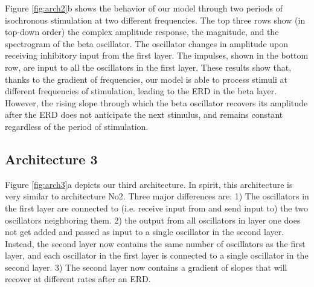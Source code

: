 \documentclass{article}
\begin{document}
Figure \ref{fig:arch2}b shows the behavior of our model through two periods of isochronous stimulation at two different frequencies. The top three rows show (in top-down order) the complex amplitude response, the magnitude, and the spectrogram of the beta oscillator. The oscillator changes in amplitude upon receiving inhibitory input from the first layer. The impulses, shown in the bottom row, are input to all the oscillators in the first layer. These results show that,  thanks to the gradient of frequencies, our model is able to process stimuli at different frequencies of stimulation, leading to the ERD in the beta layer. However, the rising slope through which the beta oscillator recovers its amplitude after the ERD does not anticipate the next stimulus, and remains constant regardless of the period of stimulation.

\subsection{Architecture 3}

Figure \ref{fig:arch3}a depicts our third architecture. In spirit, this architecture is very similar to architecture No2. Three major differences are: 1) The oscillators in the first layer are connected to (i.e. receive input from and send input to) the two oscillators neighboring them. 2) the output from all oscillators in layer one does not get added and passed as input to a single oscillator in the second layer. Instead, the second layer now contains the same number of oscillators as the first layer, and each oscillator in the first layer is connected to a single oscillator in the second layer. 3) The second layer now contains a gradient of slopes that will recover at different rates after an ERD. 
\end{document}
